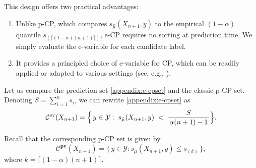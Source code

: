\documentclass{article}
\theoremstyle{plain}
\theoremstyle{definition}
\theoremstyle{remark}
\begin{document}
This design offers two practical advantages:
\begin{enumerate}

\item Unlike p-CP, which compares $s_{\hat\mu}(X_{n+1},y)$ to the empirical $(1-\alpha)$ quantile $s_{(\lceil(1-\alpha)(n+1)\rceil)}$, e-CP requires no sorting at prediction time. We simply evaluate the e-variable for each candidate label.

\item It provides a principled choice of e-variable for CP, which can be readily applied or adapted to various settings (see, e.g., \citet{gauthier2025values}).

\end{enumerate}


Let us compare the prediction set \eqref{appendix:e-cpset} and the classic p-CP set. Denoting $S=\sum_{i=1}^n s_i$, we can rewrite \eqref{appendix:e-cpset} as
\begin{equation}\label{appendix:e-CP_set_rewrite}
\mathcal{C}^{\mathrm{ev}}(X_{n+1})=
 \Bigl\{\, y\in\mathcal{Y}: \; s_{\hat\mu}(X_{n+1},y) \;<\;
\frac{S}{\,\alpha(n+1)-1\,} \Bigr\}.
\end{equation}

Recall that the corresponding p-CP set is given by
\begin{equation}
\label{appendix:split_CPset}
\mathcal{C}^{\mathbf{pv}}(X_{n+1})
= \bigl\{\, y \in \mathcal{Y} : s_{\hat{\mu}}(X_{n+1}, y) \le s_{(k)} \,\bigr\},
\end{equation}
where \(k = \lceil (1-\alpha)(n+1) \rceil\).





\end{document}
